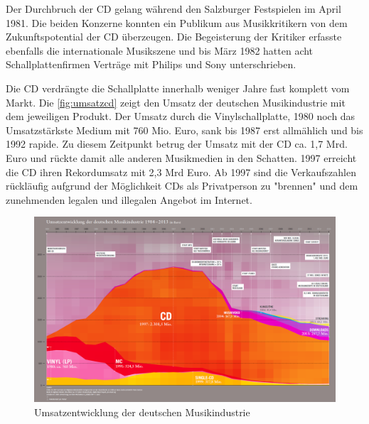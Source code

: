 Der Durchbruch der CD gelang während den Salzburger Festspielen im April 1981.
Die beiden Konzerne konnten ein Publikum aus Musikkritikern von dem
Zukunftspotential der CD überzeugen. Die Begeisterung der Kritiker erfasste
ebenfalls die internationale Musikszene und bis März 1982 hatten acht
Schallplattenfirmen Verträge mit Philips und Sony unterschrieben.

Die CD verdrängte die Schallplatte innerhalb weniger Jahre fast komplett vom
Markt. Die \autoref{fig:umsatzcd} zeigt den Umsatz der deutschen Musikindustrie
mit dem jeweiligen Produkt. Der Umsatz durch die Vinylschallplatte, 1980 noch
das Umsatzstärkste Medium mit 760 Mio. Euro, sank bis 1987 erst allmählich und
bis 1992 rapide. Zu diesem Zeitpunkt betrug der Umsatz mit der CD ca. 1,7 Mrd.
Euro und rückte damit alle anderen Musikmedien in den Schatten. 1997 erreicht
die CD ihren Rekordumsatz mit 2,3 Mrd Euro. Ab 1997 sind die Verkaufszahlen
rückläufig aufgrund der Möglichkeit CDs als Privatperson zu
"brennen" und dem zunehmenden legalen und
illegalen Angebot im Internet.

\begin{figure}[h]
  \begin{center}
      \begin{minipage}[t]{\textwidth}
        \begin{center}
            \includegraphics[width=\textwidth]{Bilder/Optische_Datentraeger_Die_Compact_Disc/Geschichte/umsatzcd.png}
            \caption[Umsatzentwicklung der deutschen Musikindustrie \newline \url{http://www.musikindustrie.de/uploads/media/140325\_BVMI\_2013\_Jahrbuch\_ePaper\_V02.pdf} S. 7 (zuletzt aufgerufen am 03.08.2015)]{Umsatzentwicklung der deutschen Musikindustrie}
            \label{fig:umsatzcd}
        \end{center}
      \end{minipage}
  \end{center}
\end{figure}

